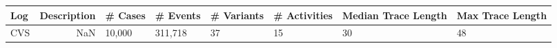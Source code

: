 \begin{tabular}{lrllllll}
\toprule
Log &  Description & \# Cases & \# Events & \# Variants & \# Activities & Median Trace Length & Max Trace Length \\
\midrule
CVS &          NaN &   10,000 &   311,718 &          37 &            15 &                  30 &               48 \\
\bottomrule
\end{tabular}
